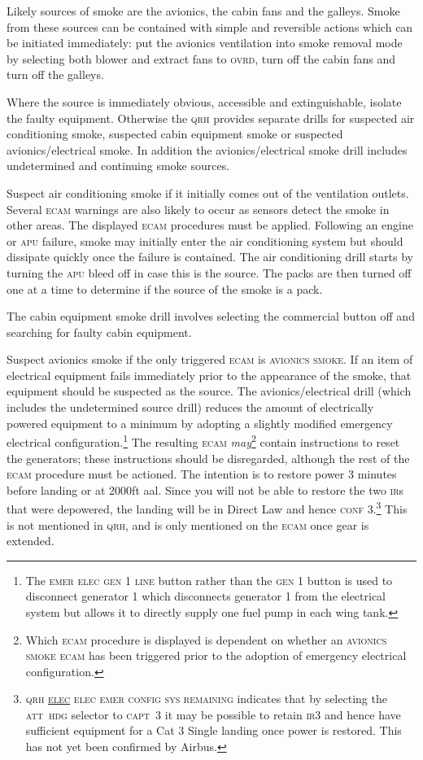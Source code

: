 \documentclass[a5paper,11pt,twoside]{book}
\newcommand{\ac}[1]{{\scshape\MakeLowercase{#1}}}
\newcommand{\ecam}[2]{{\ac{\uline{#1} #2}}}
\newcommand{\cphrase}[1]{\ac{#1}}
\begin{document}
Likely sources of smoke are the avionics, the cabin fans and the galleys. Smoke
from these sources can be contained with simple and reversible actions which can
be initiated immediately: put the avionics ventilation into smoke removal mode
by selecting both blower and extract fans to \ac{OVRD}, turn off the cabin fans
and turn off the galleys.

Where the source is immediately obvious, accessible and extinguishable, isolate
the faulty equipment. Otherwise the \ac{QRH} provides separate drills for
suspected air conditioning smoke, suspected cabin equipment smoke or suspected
avionics/electrical smoke. In addition the avionics/electrical smoke drill
includes undetermined and continuing smoke sources.

Suspect air conditioning smoke if it initially comes out of the ventilation
outlets. Several \ac{ECAM} warnings are also likely to occur as sensors detect
the smoke in other areas. The displayed \ac{ECAM} procedures must be
applied. Following an engine or \ac{APU} failure, smoke may initially enter the
air conditioning system but should dissipate quickly once the failure is
contained. The air conditioning drill starts by turning the \ac{APU} bleed off
in case this is the source. The packs are then turned off one at a time to
determine if the source of the smoke is a pack.

The cabin equipment smoke drill involves selecting the commercial button off and searching
for faulty cabin equipment.

Suspect avionics smoke if the only triggered \ac{ECAM} is \cphrase{AVIONICS
  SMOKE}. If an item of electrical equipment fails immediately prior to the
appearance of the smoke, that equipment should be suspected as the source. The
avionics/electrical drill (which includes the undetermined source drill) reduces
the amount of electrically powered equipment to a minimum by adopting a slightly
modified emergency electrical configuration.\footnote{The \cphrase{EMER ELEC GEN
  1 LINE} button rather than the \ac{GEN} 1 button is used to disconnect
generator 1 which disconnects generator 1 from the electrical system but allows
it to directly supply one fuel pump in each wing tank.} The resulting \ac{ECAM}
\emph{may}\footnote{Which \ac{ECAM} procedure is displayed is dependent on
whether an \cphrase{AVIONICS SMOKE ECAM} has been triggered prior to the
adoption of emergency electrical configuration.} contain instructions to reset
the generators; these instructions should be disregarded, although the rest of
the \ac{ECAM} procedure must be actioned. The intention is to restore power 3
minutes before landing or at 2000ft aal. Since you will not be able to restore
the two \ac{IR}s that were depowered, the landing will be in Direct Law and
hence \ac{CONF} 3.\footnote{\ac{QRH} \ecam{ELEC}{ELEC EMER CONFIG Sys Remaining}
indicates that by selecting the \cphrase{ATT~HDG} selector to \cphrase{CAPT~3} it
may be possible to retain \ac{IR}3 and hence have sufficient equipment for a Cat
3 Single landing once power is restored. This has not yet been confirmed by
Airbus.}  This is not mentioned in \ac{QRH}, and is only mentioned on the
\ac{ECAM} once gear is extended.
\end{document}
